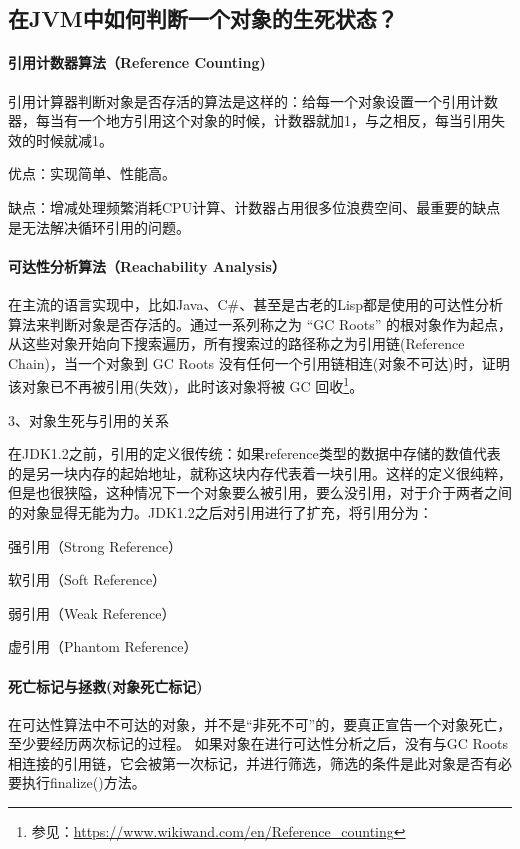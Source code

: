 \documentclass[../../../interview-questions.tex]{subfiles}
\begin{document}
\subsection{在JVM中如何判断一个对象的生死状态？}

\paragraph{引用计数器算法（Reference Counting)}

引用计算器判断对象是否存活的算法是这样的：给每一个对象设置一个引用计数器，每当有一个地方引用这个对象的时候，计数器就加1，与之相反，每当引用失效的时候就减1。

优点：实现简单、性能高。

缺点：增减处理频繁消耗CPU计算、计数器占用很多位浪费空间、最重要的缺点是无法解决循环引用的问题。

\paragraph{可达性分析算法（Reachability Analysis）}

在主流的语言实现中，比如Java、C\#、甚至是古老的Lisp都是使用的可达性分析算法来判断对象是否存活的。通过一系列称之为 “GC Roots” 的根对象作为起点，从这些对象开始向下搜索遍历，所有搜索过的路径称之为引用链(Reference Chain)，当一个对象到 GC Roots 没有任何一个引用链相连(对象不可达)时，证明该对象已不再被引用(失效)，此时该对象将被 GC 回收\footnote{参见：\url{https://www.wikiwand.com/en/Reference_counting}}。

3、对象生死与引用的关系

在JDK1.2之前，引用的定义很传统：如果reference类型的数据中存储的数值代表的是另一块内存的起始地址，就称这块内存代表着一块引用。这样的定义很纯粹，但是也很狭隘，这种情况下一个对象要么被引用，要么没引用，对于介于两者之间的对象显得无能为力。JDK1.2之后对引用进行了扩充，将引用分为：

强引用（Strong Reference）

软引用（Soft Reference）

弱引用（Weak Reference）

虚引用（Phantom Reference）

\paragraph{死亡标记与拯救(对象死亡标记)}

在可达性算法中不可达的对象，并不是“非死不可”的，要真正宣告一个对象死亡，至少要经历两次标记的过程。
如果对象在进行可达性分析之后，没有与GC Roots相连接的引用链，它会被第一次标记，并进行筛选，筛选的条件是此对象是否有必要执行finalize()方法。
\end{document}
